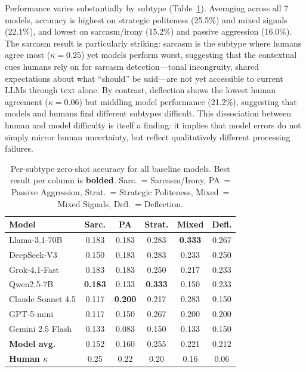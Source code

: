 \documentclass[twoside,11pt]{article}
\begin{document}
Performance varies substantially by subtype (Table~\ref{tab:baselines-subtype}). Averaging across all 7 models, accuracy is highest on strategic politeness (25.5\%) and mixed signals (22.1\%), and lowest on sarcasm/irony (15.2\%) and passive aggression (16.0\%). The sarcasm result is particularly striking: sarcasm is the subtype where humans agree most ($\kappa=0.25$) yet models perform worst, suggesting that the contextual cues humans rely on for sarcasm detection---tonal incongruity, shared expectations about what ``should'' be said---are not yet accessible to current LLMs through text alone. By contrast, deflection shows the lowest human agreement ($\kappa=0.06$) but middling model performance (21.2\%), suggesting that models and humans find different subtypes difficult. This dissociation between human and model difficulty is itself a finding: it implies that model errors do not simply mirror human uncertainty, but reflect qualitatively different processing failures.

\begin{table}[t]
\centering
\caption{Per-subtype zero-shot accuracy for all baseline models. Best result per column is \textbf{bolded}. Sarc.~= Sarcasm/Irony, PA~= Passive Aggression, Strat.~= Strategic Politeness, Mixed~= Mixed Signals, Defl.~= Deflection.}
\label{tab:baselines-subtype}
\small
\begin{tabular}{@{}lccccc@{}}
\toprule
\textbf{Model} & \textbf{Sarc.} & \textbf{PA} & \textbf{Strat.} & \textbf{Mixed} & \textbf{Defl.} \\
\midrule
Llama-3.1-70B & 0.183 & 0.183 & 0.283 & \textbf{0.333} & 0.267 \\
DeepSeek-V3 & 0.150 & 0.183 & 0.283 & 0.233 & 0.250 \\
Grok-4.1-Fast & 0.183 & 0.183 & 0.250 & 0.217 & 0.233 \\
Qwen2.5-7B & \textbf{0.183} & 0.133 & \textbf{0.333} & 0.150 & 0.233 \\
Claude Sonnet 4.5 & 0.117 & \textbf{0.200} & 0.217 & 0.283 & 0.150 \\
GPT-5-mini & 0.117 & 0.150 & 0.267 & 0.200 & 0.200 \\
Gemini 2.5 Flash & 0.133 & 0.083 & 0.150 & 0.133 & 0.150 \\
\midrule
\textbf{Model avg.} & 0.152 & 0.160 & 0.255 & 0.221 & 0.212 \\
\textbf{Human $\kappa$} & 0.25 & 0.22 & 0.20 & 0.16 & 0.06 \\
\bottomrule
\end{tabular}
\end{table}
\end{document}
